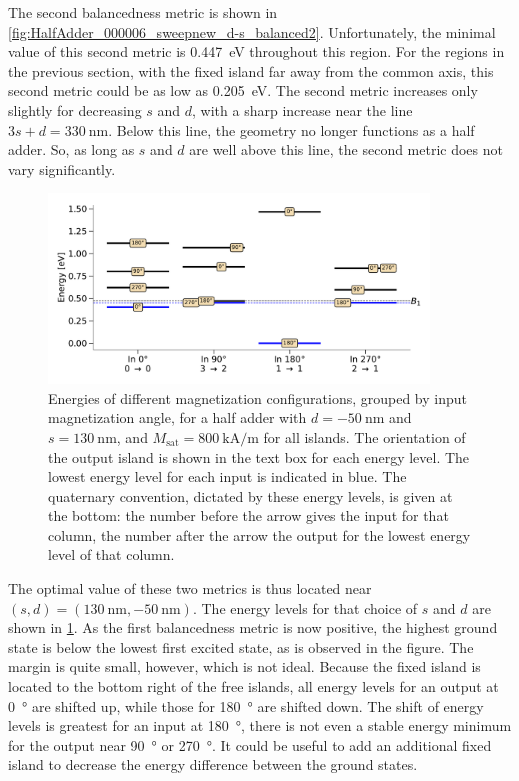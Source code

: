 \documentclass[11pt,a4paper,english,twoside]{article}
\begin{document}
The second balancedness metric is shown in \cref{fig:HalfAdder_000006_sweepnew_d-s_balanced2}. Unfortunately, the minimal value of this second metric is \SI{0.447}{\electronvolt} throughout this region. For the regions in the previous section, with the fixed island far away from the common axis, this second metric could be as low as \SI{0.205}{\electronvolt}. The second metric increases only slightly for decreasing $s$ and $d$, with a sharp increase near the line $3s+d=\SI{330}{\nano\metre}$. Below this line, the geometry no longer functions as a half adder. So, as long as $s$ and $d$ are well above this line, the second metric does not vary significantly. \par
\begin{figure}
    \centering
    \includegraphics[width=0.9\textwidth]{Figures/half_adder/energylevels/tableside(d50,s130)_energylevels.pdf}
    \caption{Energies of different magnetization configurations, grouped by input magnetization angle, for a half adder with $d=\SI{-50}{\nano\metre}$ and $s=\SI{130}{\nano\metre}$, and $M_\mathrm{sat} = \SI{800}{\kilo\ampere\per\metre}$ for all islands. The orientation of the output island is shown in the text box for each energy level. The lowest energy level for each input is indicated in blue. The quaternary convention, dictated by these energy levels, is given at the bottom: the number before the arrow gives the input for that column, the number after the arrow the output for the lowest energy level of that column.}
    \label{fig:HalfAdder_000006_energylevels_d50_s130}
\end{figure}
The optimal value of these two metrics is thus located near $(s,d)=(\SI{130}{\nano\metre}, \SI{-50}{\nano\metre})$. The energy levels for that choice of $s$ and $d$ are shown in \cref{fig:HalfAdder_000006_energylevels_d50_s130}. As the first balancedness metric is now positive, the highest ground state is below the lowest first excited state, as is observed in the figure. The margin is quite small, however, which is not ideal. Because the fixed island is located to the bottom right of the free islands, all energy levels for an output at \SI{0}{\degree} are shifted up, while those for \SI{180}{\degree} are shifted down. The shift of energy levels is greatest for an input at \SI{180}{\degree}, there is not even a stable energy minimum for the output near \SI{90}{\degree} or \SI{270}{\degree}. It could be useful to add an additional fixed island to decrease the energy difference between the ground states. \par
\end{document}
